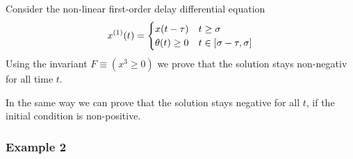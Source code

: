 \documentclass[10pt]{report}
\begin{document}
            Consider the non-linear first-order delay differential equation
            \begin{equation}
                \D{x}(t) = \begin{cases}
                     x(t-\tau) & t \geq \sigma\\
                     \theta(t)\geq 0 & t \in [\sigma-\tau,\sigma]
                \end{cases}
            \end{equation}
            Using the invariant $F\equiv(x^3\geq 0)$ we prove that the solution stays non-negativ for all time $t$.
            \footnotesize
            \begin{sequentdeduction}
            \end{sequentdeduction}\normalsize
            In the same way we can prove that the solution stays negative for all $t$, if the initial condition is non-positive.

        \subsubsection{Example 2}
            \label{sec:ddi-example-2}
\end{document}

